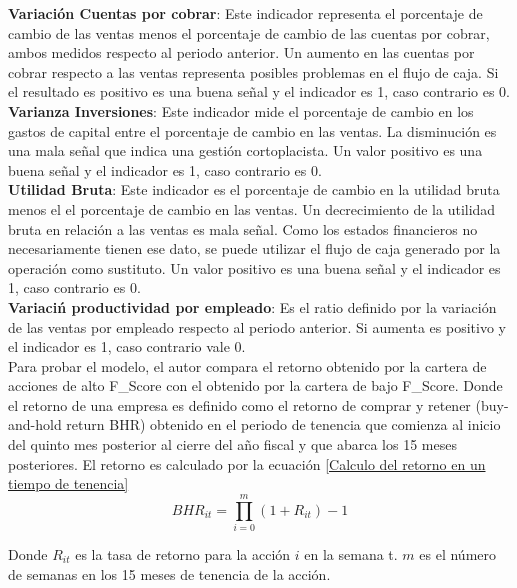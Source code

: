\textbf{Variaci\'on Cuentas por cobrar}: Este indicador representa el porcentaje de cambio de las ventas menos el porcentaje de cambio de las cuentas por cobrar, ambos medidos respecto al periodo anterior. Un aumento en las cuentas por cobrar respecto a las ventas representa posibles problemas en el flujo de caja. Si el resultado es positivo es una buena señal y el indicador es 1, caso contrario es 0.\\

\textbf{Varianza Inversiones}: Este indicador mide el porcentaje de cambio en los gastos de capital entre el porcentaje de cambio en las ventas. La disminución es una mala señal que indica una gestión cortoplacista. Un valor positivo es una buena señal y el indicador es 1, caso contrario es 0.\\

\textbf{Utilidad Bruta}: Este indicador es el porcentaje de cambio en la utilidad bruta menos el el porcentaje de cambio en las ventas. Un decrecimiento de la utilidad bruta en relación a las ventas es mala señal. Como los estados financieros no necesariamente tienen ese dato, se puede utilizar el flujo de caja generado por la operación como sustituto. Un valor positivo es una buena señal y el indicador es 1, caso contrario es 0.\\

\textbf{Variaci\'n productividad por empleado}: Es el ratio definido por la variación de las ventas por empleado respecto al periodo anterior. Si aumenta es positivo y el indicador es 1, caso contrario vale 0.\\

Para probar el modelo, el autor compara el retorno obtenido por la cartera de acciones de alto F\_Score con el obtenido por la cartera de bajo F\_Score. Donde el retorno de una empresa es definido como el retorno de comprar y retener (buy-and-hold return BHR) obtenido en el periodo de tenencia que comienza al inicio del quinto mes posterior al cierre del año fiscal y que abarca los 15 meses posteriores. El retorno es calculado por la ecuaci\'on \ref{Calculo del retorno en un tiempo de tenencia}\\

\begin{equation}
\label{Calculo del retorno en un tiempo de tenencia}
\displaystyle BHR_{it} = \prod_{i=0}^{m} (1+R_{it})-1
\end{equation}

Donde $R_{it}$ es la tasa de retorno para la acción $i$ en la semana t. $m$ es el n\'umero de semanas en los 15 meses de tenencia de la acción.\\


